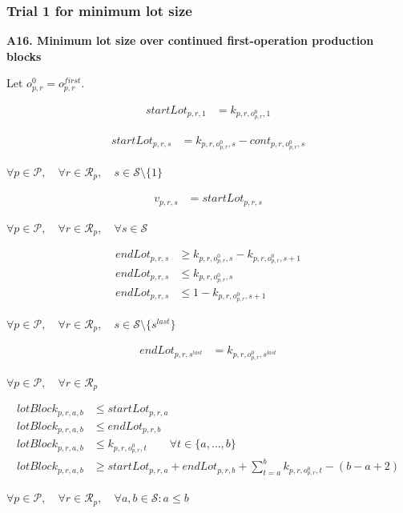 \documentclass{article}
\begin{document}
\subsubsection*{Trial 1 for minimum lot size}


\noindent\textbf{A16. Minimum lot size over continued first-operation production blocks}

Let $o^0_{p,r}=o^{first}_{p,r}$.

\begin{align}
startLot_{p,r,1}
&=
k_{p,r,o^0_{p,r},1}
\label{eq:A16_start_lot_first_shift}
\end{align}

\begin{align}
startLot_{p,r,s}
&=
k_{p,r,o^0_{p,r},s}
-
cont_{p,r,o^0_{p,r},s}
\label{eq:A16_start_lot_continuation}
\end{align}
\begin{center}
$\forall p \in \mathcal{P}, \quad
\forall r \in \mathcal{R}_p, \quad
s \in \mathcal{S}\setminus\{1\}$
\end{center}

\begin{align}
v_{p,r,s}
&=
startLot_{p,r,s}
\label{eq:A16_routing_start_lot_link}
\end{align}
\begin{center}
$\forall p \in \mathcal{P}, \quad
\forall r \in \mathcal{R}_p, \quad
\forall s \in \mathcal{S}$
\end{center}

\begin{align}
endLot_{p,r,s}
&\ge
k_{p,r,o^0_{p,r},s}
-
k_{p,r,o^0_{p,r},s+1}
\\
endLot_{p,r,s}
&\le
k_{p,r,o^0_{p,r},s}
\\
endLot_{p,r,s}
&\le
1-k_{p,r,o^0_{p,r},s+1}
\label{eq:A16_end_lot}
\end{align}
\begin{center}
$\forall p \in \mathcal{P}, \quad
\forall r \in \mathcal{R}_p, \quad
s \in \mathcal{S}\setminus\{s^{last}\}$
\end{center}

\begin{align}
endLot_{p,r,s^{last}}
&=
k_{p,r,o^0_{p,r},s^{last}}
\label{eq:A16_end_lot_last_shift}
\end{align}
\begin{center}
$\forall p \in \mathcal{P}, \quad
\forall r \in \mathcal{R}_p$
\end{center}

\begin{align}
lotBlock_{p,r,a,b}
&\le
startLot_{p,r,a}
\\
lotBlock_{p,r,a,b}
&\le
endLot_{p,r,b}
\\
lotBlock_{p,r,a,b}
&\le
k_{p,r,o^0_{p,r},t}
\qquad
\forall t \in \{a,\dots,b\}
\\
lotBlock_{p,r,a,b}
&\ge
startLot_{p,r,a}
+
endLot_{p,r,b}
+
\sum_{t=a}^{b}
k_{p,r,o^0_{p,r},t}
-
(b-a+2)
\label{eq:A16_lot_block_definition}
\end{align}
\begin{center}
$\forall p \in \mathcal{P}, \quad
\forall r \in \mathcal{R}_p, \quad
\forall a,b \in \mathcal{S}: a \le b$
\end{center}
\end{document}
